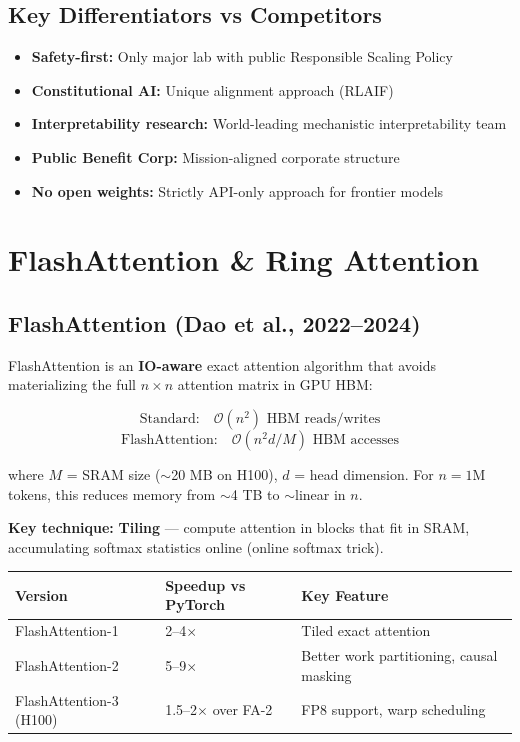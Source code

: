 \documentclass[11pt,a4paper]{article}
\begin{document}
\subsection{Key Differentiators vs Competitors}

\begin{itemize}[itemsep=1pt]
  \item \textbf{Safety-first:} Only major lab with public Responsible Scaling Policy
  \item \textbf{Constitutional AI:} Unique alignment approach (RLAIF)
  \item \textbf{Interpretability research:} World-leading mechanistic interpretability team
  \item \textbf{Public Benefit Corp:} Mission-aligned corporate structure
  \item \textbf{No open weights:} Strictly API-only approach for frontier models
\end{itemize}

\section{FlashAttention \& Ring Attention}

\subsection{FlashAttention (Dao et al., 2022--2024)}

FlashAttention is an \textbf{IO-aware} exact attention algorithm that avoids materializing the full $n \times n$ attention matrix in GPU HBM:

$$\text{Standard:}\quad \mathcal{O}(n^2) \text{ HBM reads/writes}$$
$$\text{FlashAttention:}\quad \mathcal{O}(n^2 d / M) \text{ HBM accesses}$$

where $M$ = SRAM size ($\sim$20 MB on H100), $d$ = head dimension. For $n = 1\text{M}$ tokens, this reduces memory from $\sim$4 TB to $\sim$linear in $n$.

\textbf{Key technique:} \textbf{Tiling} --- compute attention in blocks that fit in SRAM, accumulating softmax statistics online (online softmax trick).

\begin{center}
\begin{tabular}{lll}
\toprule
\textbf{Version} & \textbf{Speedup vs PyTorch} & \textbf{Key Feature} \\
\midrule
FlashAttention-1 & 2--4$\times$ & Tiled exact attention \\
FlashAttention-2 & 5--9$\times$ & Better work partitioning, causal masking \\
FlashAttention-3 (H100) & 1.5--2$\times$ over FA-2 & FP8 support, warp scheduling \\
\bottomrule
\end{tabular}
\end{center}
\end{document}

